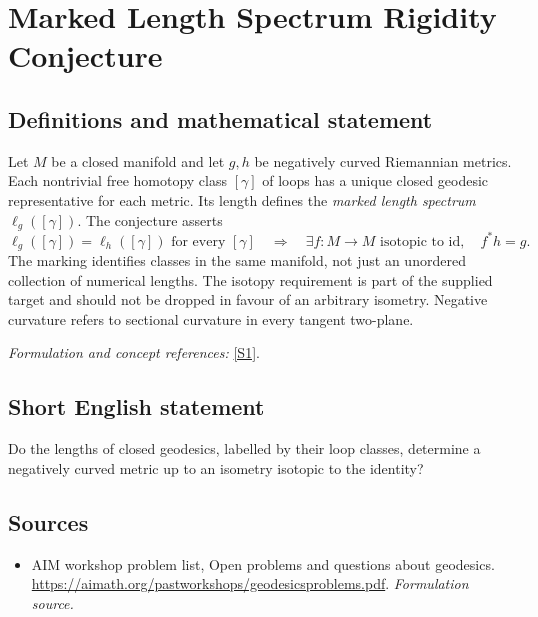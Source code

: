 \documentclass[11pt]{article}
\begin{document}
\section*{\texorpdfstring{Marked Length Spectrum Rigidity Conjecture}{Marked Length Spectrum Rigidity Conjecture}}\label{30006851}
\subsection{Definitions and mathematical statement}
Let $M$ be a closed manifold and let $g,h$ be negatively curved Riemannian metrics. Each nontrivial free homotopy class $[\gamma]$ of loops has a unique closed geodesic representative for each metric. Its length defines the \emph{marked length spectrum} $\ell_g([\gamma])$. The conjecture asserts
\[
 \ell_g([\gamma])=\ell_h([\gamma])\text{ for every }[\gamma]
 \quad\Longrightarrow\quad
 \exists f:M\to M\text{ isotopic to }\mathrm{id},\quad f^*h=g.
\]
The marking identifies classes in the same manifold, not just an unordered collection of numerical lengths. The isotopy requirement is part of the supplied target and should not be dropped in favour of an arbitrary isometry. Negative curvature refers to sectional curvature in every tangent two-plane.
\par\smallskip\textit{Formulation and concept references:} \href{https://aimath.org/pastworkshops/geodesicsproblems.pdf}{[S1]}.

\subsection{Short English statement}
Do the lengths of closed geodesics, labelled by their loop classes, determine a negatively curved metric up to an isometry isotopic to the identity?
\subsection{Sources}
\begin{itemize}
\item[S1]AIM workshop problem list, Open problems and questions about geodesics.
\url{https://aimath.org/pastworkshops/geodesicsproblems.pdf}.
\textit{Formulation source.}
\end{itemize}
\end{document}
